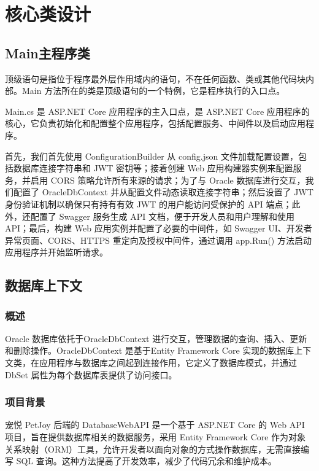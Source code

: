 \section{核心类设计}\label{sec:Core_Class_Design}

\subsection{Main主程序类}

顶级语句是指位于程序最外层作用域内的语句，不在任何函数、类或其他代码块内部。Main 方法所在的类是顶级语句的一个特例，它是程序执行的入口点。

Main.cs 是 ASP.NET Core 应用程序的主入口点，是 ASP.NET Core 应用程序的核心，它负责初始化和配置整个应用程序，包括配置服务、中间件以及启动应用程序。

首先，我们首先使用 ConfigurationBuilder 从 config.json 文件加载配置设置，包括数据库连接字符串和 JWT 密钥等；接着创建 Web 应用构建器实例来配置服务，并启用 CORS 策略允许所有来源的请求；为了与 Oracle 数据库进行交互，我们配置了 OracleDbContext 并从配置文件动态读取连接字符串；然后设置了 JWT 身份验证机制以确保只有持有有效 JWT 的用户能访问受保护的 API 端点；此外，还配置了 Swagger 服务生成 API 文档，便于开发人员和用户理解和使用 API；最后，构建 Web 应用实例并配置了必要的中间件，如 Swagger UI、开发者异常页面、CORS、HTTPS 重定向及授权中间件，通过调用 app.Run() 方法启动应用程序并开始监听请求。

\subsection{数据库上下文}

\subsubsection{概述}
Oracle 数据库依托于OracleDbContext 进行交互，管理数据的查询、插入、更新和删除操作。OracleDbContext 是基于Entity Framework Core 实现的数据库上下文类，在应用程序与数据库之间起到连接作用，它定义了数据库模式，并通过 DbSet 属性为每个数据库表提供了访问接口。


\subsubsection{项目背景}
宠悦 PetJoy 后端的 DatabaseWebAPI 是一个基于 ASP.NET Core 的 Web API 项目，旨在提供数据库相关的数据服务，采用 Entity Framework Core 作为对象关系映射（ORM）工具，允许开发者以面向对象的方式操作数据库，无需直接编写 SQL 查询。这种方法提高了开发效率，减少了代码冗余和维护成本。

